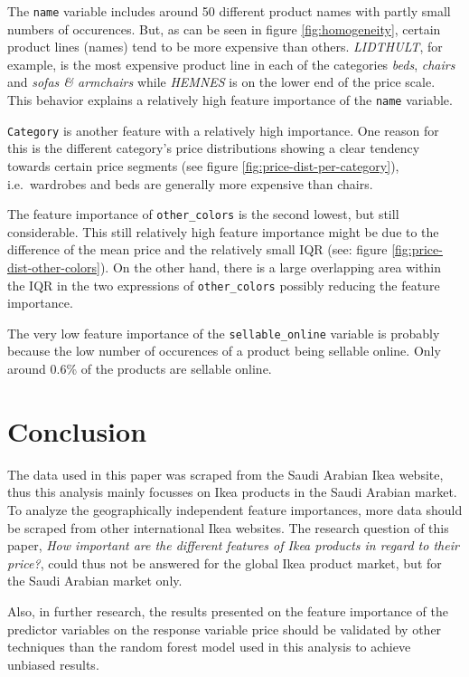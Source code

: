 \documentclass[a4paper, nobind]{templates/ociamthesis}
\begin{document}
The \texttt{name} variable includes around 50 different product names with partly small numbers of occurences. But, as can be seen in figure \ref{fig:homogeneity}, certain product lines (names) tend to be more expensive than others. \emph{LIDTHULT}, for example, is the most expensive product line in each of the categories \emph{beds}, \emph{chairs} and \emph{sofas \& armchairs} while \emph{HEMNES} is on the lower end of the price scale. This behavior explains a relatively high feature importance of the \texttt{name} variable.

\texttt{Category} is another feature with a relatively high importance. One reason for this is the different category's price distributions showing a clear tendency towards certain price segments (see figure \ref{fig:price-dist-per-category}), i.e.~wardrobes and beds are generally more expensive than chairs.

The feature importance of \texttt{other\_colors} is the second lowest, but still considerable. This still relatively high feature importance might be due to the difference of the mean price and the relatively small IQR (see: figure \ref{fig:price-dist-other-colors}). On the other hand, there is a large overlapping area within the IQR in the two expressions of \texttt{other\_colors} possibly reducing the feature importance.

The very low feature importance of the \texttt{sellable\_online} variable is probably because the low number of occurences of a product being sellable online. Only around 0.6\% of the products are sellable online.

\hypertarget{conclusion}{%
\section{Conclusion}\label{conclusion}}

The data used in this paper was scraped from the Saudi Arabian Ikea website, thus this analysis mainly focusses on Ikea products in the Saudi Arabian market. To analyze the geographically independent feature importances, more data should be scraped from other international Ikea websites. The research question of this paper, \emph{How important are the different features of Ikea products in regard to their price?}, could thus not be answered for the global Ikea product market, but for the Saudi Arabian market only.

Also, in further research, the results presented on the feature importance of the predictor variables on the response variable price should be validated by other techniques than the random forest model used in this analysis to achieve unbiased results.
\end{document}
